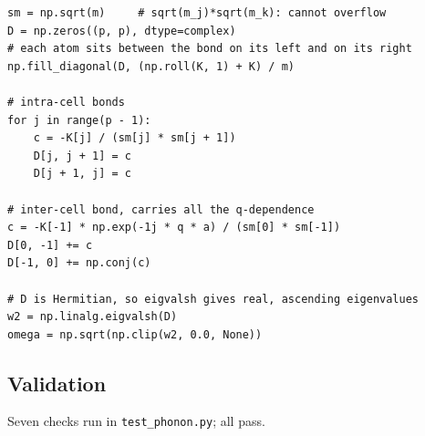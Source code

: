 \documentclass[aps,prb,reprint,nofootinbib]{revtex4-2}
\begin{document}
\begin{lstlisting}[caption={Construction of the dynamical matrix for $p\ge2$. \texttt{K} holds one
spring constant per bond, \texttt{K[j]} joining atom $j$ to $j+1$ and \texttt{K[-1]} the inter-cell
bond; a scalar $K$ is expanded to equal values, the case used throughout this report. The
\texttt{+=} on the inter-cell bond is the subtlety discussed in Sec.~\ref{sec:theory}.},label={lst:core},
firstnumber=1]
sm = np.sqrt(m)     # sqrt(m_j)*sqrt(m_k): cannot overflow
D = np.zeros((p, p), dtype=complex)
# each atom sits between the bond on its left and on its right
np.fill_diagonal(D, (np.roll(K, 1) + K) / m)

# intra-cell bonds
for j in range(p - 1):
    c = -K[j] / (sm[j] * sm[j + 1])
    D[j, j + 1] = c
    D[j + 1, j] = c

# inter-cell bond, carries all the q-dependence
c = -K[-1] * np.exp(-1j * q * a) / (sm[0] * sm[-1])
D[0, -1] += c
D[-1, 0] += np.conj(c)

# D is Hermitian, so eigvalsh gives real, ascending eigenvalues
w2 = np.linalg.eigvalsh(D)
omega = np.sqrt(np.clip(w2, 0.0, None))
\end{lstlisting}

\subsection{Validation}

Seven checks run in \texttt{test\_phonon.py}; all pass.
\end{document}
